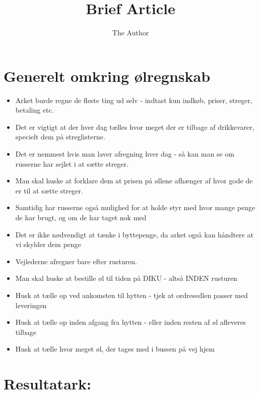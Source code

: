 \documentclass[11pt]{article} %
\title{Brief Article}
\author{The Author}
\begin{document}
\section*{Generelt omkring ølregnskab}

\begin{itemize}
\item Arket burde regne de fleste ting ud selv - indtast kun indkøb, priser, streger, betaling etc.

\item Det er vigtigt at der hver dag tælles hvor meget der er tilbage af drikkevarer, specielt dem på streglisterne.

\item Det er nemmest hvis man laver afregning hver dag - så kan man se om russerne har sejlet i at sætte streger.

\item Man skal huske at forklare dem at prisen på øllene afhænger af hvor gode de er til at sætte streger.

\item Samtidig har russerne også mulighed for at holde styr med hvor mange penge de har brugt, og om de har taget nok med

\item Det er ikke nødvendigt at tænke i byttepenge, da arket også kan håndtere at vi skylder dem penge

\item Vejlederne afregner bare efter rusturen.

\item Man skal huske at bestille øl til tiden på DIKU - altså INDEN rusturen

\item Husk at tælle op ved ankomsten til hytten - tjek at ordresedlen passer med leveringen

\item Husk at tælle op inden afgang fra hytten - eller inden resten af øl afleveres tilbage

\item Husk at tælle hvor meget øl, der tages med i bussen på vej hjem

\end{itemize}

\section*{Resultatark:}
\end{document}

